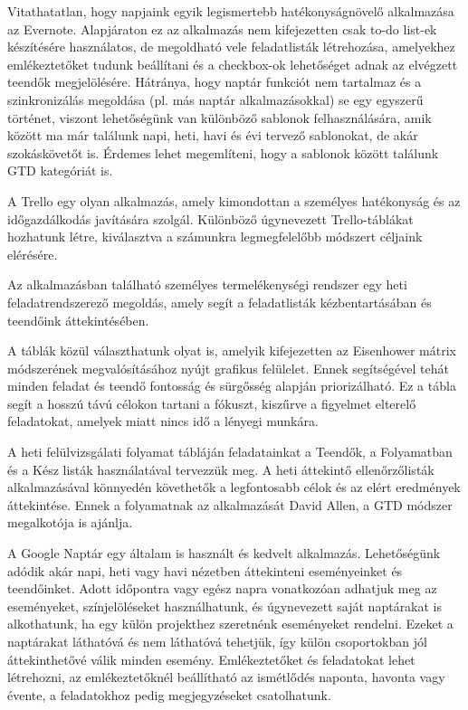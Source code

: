 
Vitathatatlan, hogy napjaink egyik legismertebb hatékonyságnövelő alkalmazása az Evernote. Alapjáraton ez az alkalmazás nem kifejezetten csak to-do list-ek készítésére használatos, de megoldható vele feladatlisták létrehozása, amelyekhez emlékeztetőket tudunk beállítani és a checkbox-ok lehetőséget adnak az elvégzett teendők megjelölésére. Hátránya, hogy naptár funkciót nem tartalmaz és a szinkronizálás megoldása (pl. más naptár alkalmazásokkal) se egy egyszerű történet, viszont lehetőségünk van különböző sablonok felhasználására, amik között ma már találunk napi, heti, havi és évi tervező sablonokat, de akár szokáskövetőt is. Érdemes lehet megemlíteni, hogy a sablonok között találunk GTD kategóriát is.


A Trello egy olyan alkalmazás, amely kimondottan a személyes hatékonyság és az időgazdálkodás javítására szolgál. Különböző úgynevezett Trello-táblákat hozhatunk létre, kiválasztva a számunkra legmegfelelőbb módszert céljaink elérésére.

Az alkalmazásban található személyes termelékenységi rendszer egy heti feladatrendszerező megoldás, amely segít a feladatlisták kézbentartásában és teendőink áttekintésében.

A táblák közül választhatunk olyat is, amelyik kifejezetten az Eisenhower mátrix módszerének megvalósításához nyújt grafikus felülelet. Ennek segítségével tehát minden feladat és teendő fontosság és sürgősség alapján priorizálható. Ez a tábla segít a hosszú távú célokon tartani a fókuszt, kiszűrve a figyelmet elterelő feladatokat, amelyek miatt nincs idő a lényegi munkára.

A heti felülvizsgálati folyamat tábláján feladatainkat a Teendők, a Folyamatban és a Kész listák használatával tervezzük meg. A heti áttekintő ellenőrzőlisták alkalmazásával könnyedén követhetők a legfontosabb célok és az elért eredmények áttekintése. Ennek a folyamatnak az alkalmazását David Allen, a GTD módszer megalkotója is ajánlja.\cite{trello}


A Google Naptár egy általam is használt és kedvelt alkalmazás. Lehetőségünk adódik akár napi, heti vagy havi nézetben áttekinteni eseményeinket és teendőinket. Adott időpontra vagy egész napra vonatkozóan adhatjuk meg az eseményeket, színjelöléseket használhatunk, és úgynevezett saját naptárakat is alkothatunk, ha egy külön projekthez szeretnénk eseményeket rendelni. Ezeket a naptárakat láthatóvá és nem láthatóvá tehetjük, így külön csoportokban jól áttekinthetővé válik minden esemény. Emlékeztetőket és feladatokat lehet létrehozni, az emlékeztetőknél beállítható az ismétlődés naponta, havonta vagy évente, a feladatokhoz pedig megjegyzéseket csatolhatunk.

